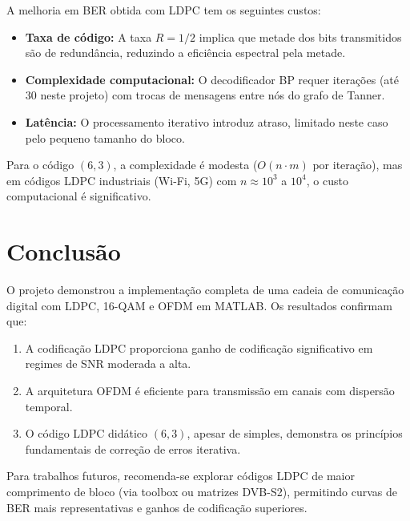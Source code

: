 \documentclass[conference]{IEEEtran}
\begin{document}
A melhoria em BER obtida com LDPC tem os seguintes custos:

\begin{itemize}
    \item \textbf{Taxa de código:} A taxa $R = 1/2$ implica que metade dos bits transmitidos são de redundância, reduzindo a eficiência espectral pela metade.
    \item \textbf{Complexidade computacional:} O decodificador BP requer iterações (até 30 neste projeto) com trocas de mensagens entre nós do grafo de Tanner.
    \item \textbf{Latência:} O processamento iterativo introduz atraso, limitado neste caso pelo pequeno tamanho do bloco.
\end{itemize}

Para o código $(6,3)$, a complexidade é modesta ($O(n \cdot m)$ por iteração), mas em códigos LDPC industriais (Wi-Fi, 5G) com $n \approx 10^3$ a $10^4$, o custo computacional é significativo.

\section{Conclusão}

O projeto demonstrou a implementação completa de uma cadeia de comunicação digital com LDPC, 16-QAM e OFDM em MATLAB. Os resultados confirmam que:

\begin{enumerate}
    \item A codificação LDPC proporciona ganho de codificação significativo em regimes de SNR moderada a alta.
    \item A arquitetura OFDM é eficiente para transmissão em canais com dispersão temporal.
    \item O código LDPC didático $(6,3)$, apesar de simples, demonstra os princípios fundamentais de correção de erros iterativa.
\end{enumerate}

Para trabalhos futuros, recomenda-se explorar códigos LDPC de maior comprimento de bloco (via toolbox ou matrizes DVB-S2), permitindo curvas de BER mais representativas e ganhos de codificação superiores.
\end{document}
